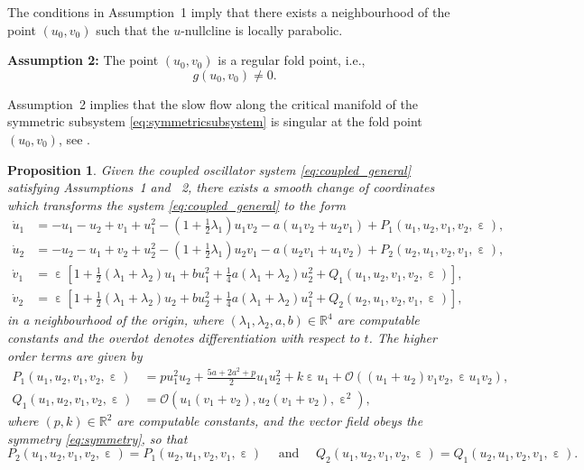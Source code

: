 \documentclass[10pt,onecolumn]{article}
\theoremstyle{plain}
\newtheorem{proposition}{Proposition}[section]
\DeclareMathOperator{\eps}{\varepsilon}
\begin{document}
The conditions in Assumption~1 imply that there exists a neighbourhood of the point $(u_0,v_0)$ such that the $u$-nullcline is locally parabolic. 


{\bf Assumption 2:} The point $(u_0,v_0)$ is a regular fold point, i.e.,
%
\[ g(u_0,v_0) \neq 0. \]
%

Assumption~2 implies that the slow flow along the critical manifold of the symmetric subsystem \eqref{eq:symmetricsubsystem} is singular at the fold point $(u_0,v_0)$, see \cite{Krupa2001}.

\medskip

\begin{proposition} \label{prop:normalform}
Given the coupled oscillator system \eqref{eq:coupled_general} satisfying Assumptions~1 and ~2, there exists a smooth change of coordinates which transforms the system \eqref{eq:coupled_general} to the form 
%
\begin{equation} \label{eq:normalform}
  \begin{split}
    \dot u_1 &= -u_1-u_2+v_1+u_1^2-\left( 1+\tfrac{1}{2}\lambda_1 \right) u_1 v_2 -a (u_1 v_2+u_2 v_1) + P_1(u_1,u_2,v_1,v_2,\eps), \\
    \dot u_2 &= -u_2-u_1+v_2+u_2^2  - \left( 1+\tfrac{1}{2}\lambda_1 \right) u_2 v_1 -a (u_2 v_1+u_1 v_2)+ P_2(u_2,u_1,v_2,v_1,\eps), \\
    \dot v_1 &= \eps \left[ 1+\tfrac{1}{2} (\lambda_1+\lambda_2) u_1+ b u_1^2 + \tfrac{1}{4} a (\lambda_1+\lambda_2)u_2^2 + Q_1(u_1,u_2,v_1,v_2,\eps) \right], \\ 
    \dot v_2 &= \eps \left[ 1+\tfrac{1}{2} (\lambda_1+\lambda_2) u_2 + b u_2^2+ \tfrac{1}{4} a \left( \lambda_1+\lambda_2 \right) u_1^2  + Q_2(u_2,u_1,v_2,v_1,\eps) \right],
  \end{split}
\end{equation}
%
in a neighbourhood of the origin, where $(\lambda_1,\lambda_2,a,b) \in \mathbb R^4$ are computable constants and the overdot denotes differentiation with respect to $t$. The higher order terms are given by 
%
\begin{equation*}
  \begin{split}
    P_1(u_1,u_2,v_1,v_2,\eps) &= p u_1^2 u_2 + \tfrac{5a+2a^2+p}{2} u_1 u_2^2 + k \eps u_1 + \mathcal O\left( (u_1+u_2) v_1 v_2,  \eps u_1 v_2  \right), \\
    Q_1(u_1,u_2,v_1,v_2,\eps) &= \mathcal O\left( u_1 (v_1+v_2), u_2 (v_1+v_2), \eps^2 \right),
  \end{split}
\end{equation*}
% 
where $(p,k) \in \mathbb R^2$ are computable constants, and the vector field obeys the symmetry \eqref{eq:symmetry}, so that 
%
\[ P_2(u_1,u_2,v_1,v_2,\eps) = P_1(u_2,u_1,v_2,v_1,\eps) \quad \text{ and } \quad Q_2(u_1,u_2,v_1,v_2,\eps) = Q_1(u_2,u_1,v_2,v_1,\eps). \] 
%
%
%
\end{proposition}
\end{document}
